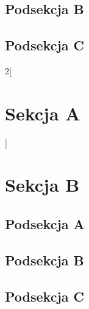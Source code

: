 \subsection{Podsekcja B}
\subsection*{Podsekcja C}

\newpage

\begin{multicols}{2}[
    \section{Sekcja A}
]


\lipsum[1]
\section*{Sekcja B}
\lipsum[1]
\subsection*{Podsekcja A}
\indent \lipsum[1]
\subsection{Podsekcja B}
\lipsum[1]

\end{multicols}
\subsection*{Podsekcja C}

\lipsum[1-8]
    
    


